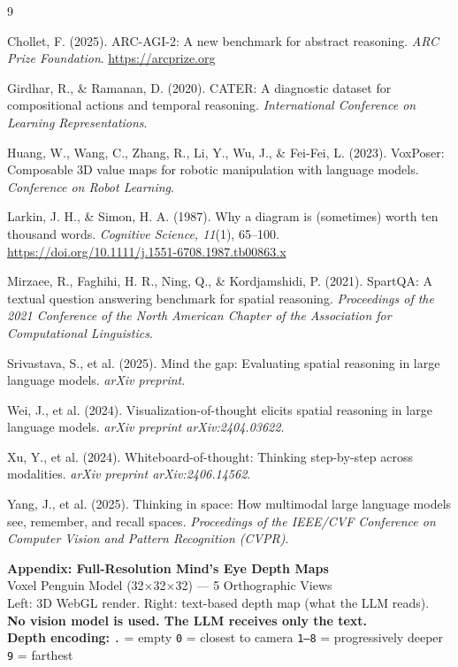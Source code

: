 \documentclass[12pt,a4paper]{article}
\begin{document}
\newpage
\begin{thebibliography}{9}

Chollet, F. (2025). ARC-AGI-2: A new benchmark for abstract reasoning. \emph{ARC Prize Foundation}. \url{https://arcprize.org}

Girdhar, R., \& Ramanan, D. (2020). CATER: A diagnostic dataset for compositional actions and temporal reasoning. \emph{International Conference on Learning Representations}.

Huang, W., Wang, C., Zhang, R., Li, Y., Wu, J., \& Fei-Fei, L. (2023). VoxPoser: Composable 3D value maps for robotic manipulation with language models. \emph{Conference on Robot Learning}.

Larkin, J. H., \& Simon, H. A. (1987). Why a diagram is (sometimes) worth ten thousand words. \emph{Cognitive Science, 11}(1), 65--100. \url{https://doi.org/10.1111/j.1551-6708.1987.tb00863.x}

Mirzaee, R., Faghihi, H. R., Ning, Q., \& Kordjamshidi, P. (2021). SpartQA: A textual question answering benchmark for spatial reasoning. \emph{Proceedings of the 2021 Conference of the North American Chapter of the Association for Computational Linguistics}.

Srivastava, S., et al. (2025). Mind the gap: Evaluating spatial reasoning in large language models. \emph{arXiv preprint}.

Wei, J., et al. (2024). Visualization-of-thought elicits spatial reasoning in large language models. \emph{arXiv preprint arXiv:2404.03622}.

Xu, Y., et al. (2024). Whiteboard-of-thought: Thinking step-by-step across modalities. \emph{arXiv preprint arXiv:2406.14562}.

Yang, J., et al. (2025). Thinking in space: How multimodal large language models see, remember, and recall spaces. \emph{Proceedings of the IEEE/CVF Conference on Computer Vision and Pattern Recognition (CVPR)}.

\end{thebibliography}

\newpage
\begin{center}
{\large\bfseries Appendix: Full-Resolution Mind's Eye Depth Maps}\\[6pt]
\normalsize Voxel Penguin Model (32$\times$32$\times$32) --- 5 Orthographic Views\\
Left: 3D WebGL render. Right: text-based depth map (what the LLM reads).\\
\textbf{No vision model is used. The LLM receives only the text.}\\[6pt]
\small\textbf{Depth encoding:} \texttt{.} = empty \quad \texttt{0} = closest to camera \quad \texttt{1--8} = progressively deeper \quad \texttt{9} = farthest
\end{center}
\end{document}
